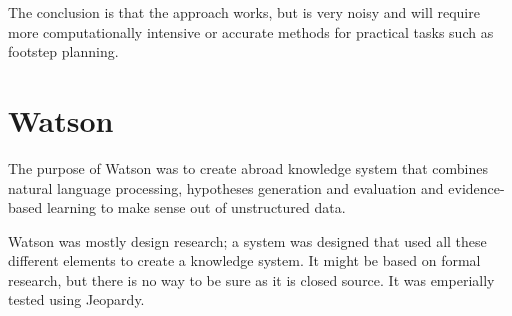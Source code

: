 \documentclass[a4paper, 12pt]{article}
\begin{document}
The conclusion is that the approach works, but is very noisy and will require
more computationally intensive or accurate methods for practical tasks such as
footstep planning.

\section{Watson}
The purpose of Watson was to create abroad knowledge system that combines natural language
processing, hypotheses generation and evaluation and evidence-based learning to
make sense out of unstructured data.

Watson was mostly design research; a system was designed that used all these
different elements to create a knowledge system. It might be based on formal
research, but there is no way to be sure as it is closed source. It was
emperially tested using Jeopardy. 
	
\end{document}
